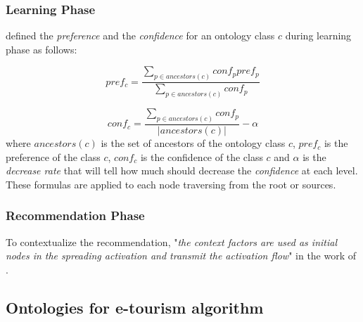 \subsubsection{Learning Phase}
\cite{bahramian_abbaspour_claramunt_2017} defined the \textit{preference} and the \textit{confidence} for an ontology class $c$ during learning phase as follows:

\begin{equation} \label{eq:preference}
    pref_c = \frac{\displaystyle \sum_{p \in ancestors(c)}{conf_p pref_p}}
                    {\displaystyle  \sum_{p \in ancestors(c)} {conf_p}}
\end{equation}

\begin{equation} \label{eq:confidence}
    conf_c = \frac{\displaystyle \sum_{p \in ancestors(c)} {conf_p}}{|ancestors(c)|} - \alpha
\end{equation}
where $ancestors(c)$ is the set of ancestors of the ontology class $c$, $pref_c$ is the preference of the class $c$, $conf_c$ is the confidence of the class $c$ and $\alpha$ is the \textit{decrease rate} that will tell how much should decrease the \textit{confidence} at each level. These formulas are applied to each node traversing from the root or sources.

\subsubsection{Recommendation Phase}
To contextualize the recommendation, "\textit{the context factors are used as initial nodes in the spreading activation and transmit the activation flow}" in the work of \cite{bahramian_abbaspour_claramunt_2017}.

\subsection{Ontologies for e-tourism algorithm}
